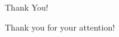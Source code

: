 \documentclass[svgnames, 12pt]{beamer}
\begin{document}
\begin{frame}{Thank You!}
	\begin{center}
		\Huge Thank you for your attention!
	\end{center}
\end{frame}

\end{document}
